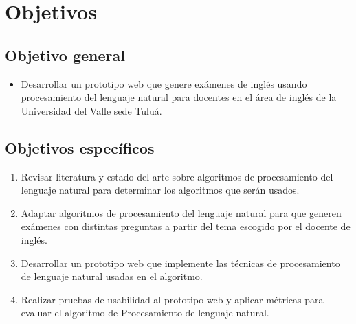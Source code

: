 \documentclass[../Main.tex]{subfiles}
\begin{document}
\section{Objetivos}

\subsection{Objetivo general}

\begin{itemize}
	\item Desarrollar un prototipo web que genere exámenes de inglés usando procesamiento del lenguaje natural para docentes en el área de inglés de la Universidad del Valle sede Tuluá. \par
\end{itemize}\par


\subsection{Objetivos específicos}

\begin{enumerate}
	\item Revisar literatura y estado del arte sobre algoritmos de procesamiento del lenguaje natural para determinar los algoritmos que serán usados.\par

	\item Adaptar algoritmos de procesamiento del lenguaje natural para que generen exámenes con distintas preguntas a partir del tema escogido por el docente de inglés. \par

	\item Desarrollar un prototipo web que implemente las técnicas de procesamiento de lenguaje natural usadas en el algoritmo. \par

	\item Realizar pruebas de usabilidad al prototipo web y aplicar métricas para evaluar el algoritmo de Procesamiento de lenguaje natural.
\end{enumerate}\par
\end{document}
